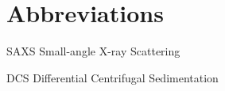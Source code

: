 \section*{Abbreviations}

\thispagestyle{empty}


SAXS Small-angle X-ray Scattering

DCS Differential Centrifugal Sedimentation

